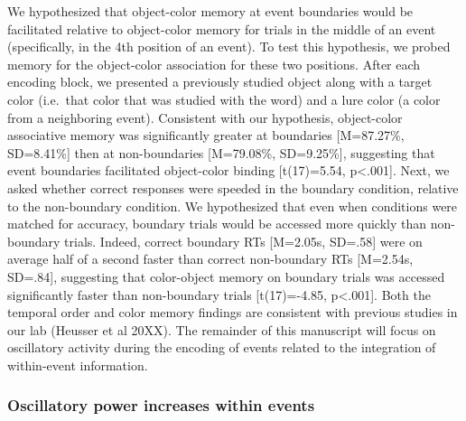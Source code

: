We hypothesized that object-color memory at event boundaries would be
facilitated relative to object-color memory for trials in the middle of
an event (specifically, in the 4th position of an event). To test this
hypothesis, we probed memory for the object-color association for these
two positions. After each encoding block, we presented a previously
studied object along with a target color (i.e.~that color that was
studied with the word) and a lure color (a color from a neighboring
event). Consistent with our hypothesis, object-color associative memory
was significantly greater at boundaries {[}M=87.27\%, SD=8.41\%{]} then
at non-boundaries {[}M=79.08\%, SD=9.25\%{]}, suggesting that event
boundaries facilitated object-color binding {[}t(17)=5.54,
p\textless{}.001{]}. Next, we asked whether correct responses were
speeded in the boundary condition, relative to the non-boundary
condition. We hypothesized that even when conditions were matched for
accuracy, boundary trials would be accessed more quickly than
non-boundary trials. Indeed, correct boundary RTs {[}M=2.05s, SD=.58{]}
were on average half of a second faster than correct non-boundary RTs
{[}M=2.54s, SD=.84{]}, suggesting that color-object memory on boundary
trials was accessed significantly faster than non-boundary trials
{[}t(17)=-4.85, p\textless{}.001{]}. Both the temporal order and color
memory findings are consistent with previous studies in our lab (Heusser
et al 20XX). The remainder of this manuscript will focus on oscillatory
activity during the encoding of events related to the integration of
within-event information.

\subsubsection{Oscillatory power increases within
events}\label{oscillatory-power-increases-within-events}

